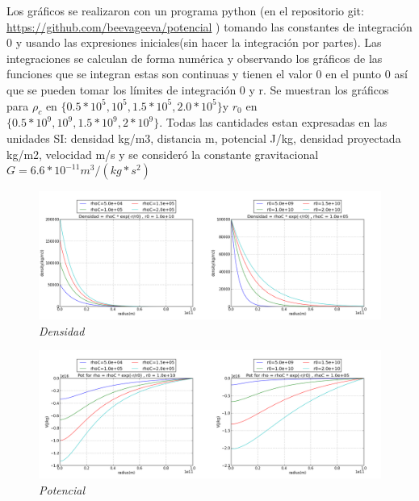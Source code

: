 \documentclass[12pt]{book}
\begin{document}
\begin{description}
\item Los gráficos se realizaron con un programa python (en el repositorio git: \url{https://github.com/beevageeva/potencial} ) tomando las constantes de integración 0 y usando las expresiones iniciales(sin hacer la integración por partes). 
Las integraciones se calculan de forma numérica y observando los gráficos de las funciones que se integran estas son continuas y tienen el valor 0 en el punto 0 así que se pueden tomar los límites de integración 0 y r.
Se muestran los gráficos  para $\rho_c$ en $ \{0.5 * 10^5, 10^5, 1.5 * 10^5, 2.0 * 10^5 \} $y $r_0$ en $\{0.5 * 10^9, 10^9, 1.5 * 10^9 ,2 * 10^9 \}$. 
Todas las cantidades estan expresadas en las unidades SI: densidad kg/m3, distancia m, potencial J/kg, densidad proyectada kg/m2, velocidad m/s y se consideró la constante gravitacional $G = 6.6 * 10^{-11} m^3/(kg * s^2)$



\item

\begin{figure}[!ht]
 \centering
 \includegraphics[scale=0.33]{densFinal.png}
 \caption{\emph{Densidad}}
\end{figure}

\item

\begin{figure}[!ht]
 \centering
 \includegraphics[scale=0.33]{potFinal.png}
 \caption{\emph{Potencial}}
\end{figure}


\end{description}
\end{document}
